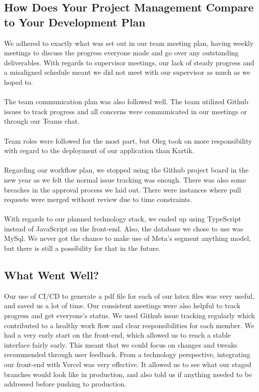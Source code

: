 \documentclass{article}
\begin{document}
\subsection{How Does Your Project Management Compare to Your Development Plan}
We adhered to exactly what was set out in our team meeting plan, having weekly meetings to discuss the progress everyone made and go over any outstanding deliverables. With regards to supervisor meetings, our lack of steady progress and a misaligned schedule meant we did not meet with our supervisor as much as we hoped to.
\\\\
The team communication plan was also followed well. The team utilized Github issues to track progress and all concerns were communicated in our meetings or through our Teams chat.
\\\\
Team roles were followed for the most part, but Oleg took on more responsibility with regard to the deployment of our application than Kartik.
\\\\
Regarding our workflow plan, we stopped using the Github project board in the new year as we felt the normal issue tracking was enough. There was also some breaches in the approval process we laid out. There were instances where pull requests were merged without review due to time constraints.
\\\\
With regards to our planned technology stack, we ended up using TypeScript instead of JavaScript on the front-end. Also, the database we chose to use was MySql. We never got the chance to make use of Meta's segment anything model, but there is still a possibility for that in the future.

\subsection{What Went Well?}
Our use of CI/CD to generate a pdf file for each of our latex files was very useful, and saved us a lot of time. Our consistent meetings were also helpful to track progress and get everyone's status. We used Github issue tracking regularly which contributed to a healthy work flow and clear responsibilities for each member. We had a very early start on the front-end, which allowed us to reach a stable interface fairly early. This meant that we could focus on changes and tweaks recommended through user feedback. From a technology perspective, integrating our front-end with Vercel was very effective. It allowed us to see what our staged branches would look like in production, and also told us if anything needed to be addressed before pushing to production.
\end{document}
